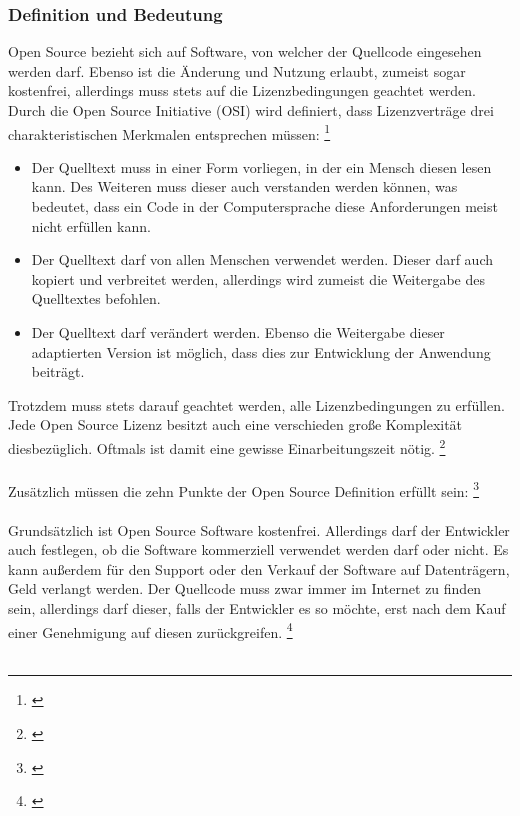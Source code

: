 \documentclass[titlepage,12pt,twoside]{article}
\begin{document}
\subsubsection{Definition und Bedeutung}
Open Source bezieht sich auf Software, von welcher der Quellcode eingesehen werden darf. 
Ebenso ist die Änderung und Nutzung erlaubt, zumeist sogar kostenfrei, allerdings muss stets auf die 
Lizenzbedingungen geachtet werden. Durch die Open Source Initiative (OSI) wird definiert, dass Lizenzverträge 
drei charakteristischen Merkmalen entsprechen müssen: \footnote{\cite{WikipediaOpenSource}} \\
\begin{itemize}
	\item Der Quelltext muss in einer Form vorliegen, in der ein Mensch diesen lesen kann. Des Weiteren muss 
	dieser auch verstanden werden können, was bedeutet, dass ein Code in der Computersprache diese 
	Anforderungen meist nicht erfüllen kann. 
	\item Der Quelltext darf von allen Menschen verwendet werden. Dieser darf auch kopiert und verbreitet 
	werden, allerdings wird zumeist die Weitergabe des Quelltextes befohlen.
	\item Der Quelltext darf verändert werden. Ebenso die Weitergabe dieser adaptierten Version ist möglich, 
	dass dies zur Entwicklung der Anwendung beiträgt. 
\end{itemize}
\hfill \break
Trotzdem muss stets darauf geachtet werden, alle Lizenzbedingungen zu erfüllen. Jede Open Source Lizenz 
besitzt auch eine verschieden große Komplexität diesbezüglich. Oftmals ist damit eine gewisse 
Einarbeitungszeit nötig. \footnote{\cite{WikipediaOpenSource12}} \\
\\
Zusätzlich müssen die zehn Punkte der Open Source Definition erfüllt sein:  \footnote{\cite{Opensource}} \\
\\
Grundsätzlich ist Open Source Software kostenfrei. Allerdings darf der Entwickler auch festlegen, ob die 
Software kommerziell verwendet werden darf oder nicht. Es kann außerdem für den Support oder den Verkauf 
der Software auf Datenträgern, Geld verlangt werden. Der Quellcode muss zwar immer im Internet zu finden sein, 
allerdings darf dieser, falls der Entwickler es so möchte, erst nach dem Kauf einer Genehmigung auf diesen 
zurückgreifen. \footnote{\cite{Giga}} \\
\\
\end{document}
